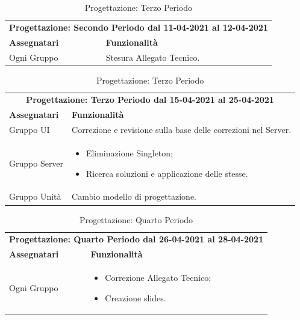 \begin{table} [h!]
	\begin{center}
		\begin{tabular} { m{4cm}  m{11cm}  }	
			\multicolumn{2}{c}{	\textbf{Progettazione: Secondo Periodo dal 11-04-2021 al 12-04-2021}} \\
			\rowcolor{lightgray}
			\textbf{Assegnatari} & \textbf{Funzionalità} \\
			Ogni Gruppo & Stesura Allegato Tecnico.\\
		\end{tabular}
		\caption{Progettazione: Terzo Periodo}
	\end{center}
\end{table}


\begin{table} [h!]
	\begin{center}
		\begin{tabular} { m{4cm}  m{11cm}  }	
			\multicolumn{2}{c}{	\textbf{Progettazione: Terzo Periodo dal 15-04-2021 al 25-04-2021}} \\
			\rowcolor{lightgray}
			\textbf{Assegnatari} & \textbf{Funzionalità} \\
			Gruppo UI & 
			Correzione e revisione sulla base delle correzioni nel Server.\\
			Gruppo Server & \begin{itemize}
				\item Eliminazione Singleton;
				\item Ricerca soluzioni e applicazione delle stesse.
			\end{itemize}\\
			Gruppo Unità & Cambio modello di progettazione.\\	
		\end{tabular}
		\caption{Progettazione: Terzo Periodo}
	\end{center}
\end{table}


\begin{table} [h!]
	\begin{center}
		\begin{tabular} { m{4cm}  m{11cm}  }	
			\multicolumn{2}{c}{	\textbf{Progettazione: Quarto Periodo dal 26-04-2021 al 28-04-2021}} \\
			\rowcolor{lightgray}
			\textbf{Assegnatari} & \textbf{Funzionalità} \\
			Ogni Gruppo & \begin{itemize}
				\item Correzione Allegato Tecnico;
				\item Creazione slides.
			\end{itemize}\\		
		\end{tabular}
		\caption{Progettazione: Quarto Periodo}
	\end{center}
\end{table}


